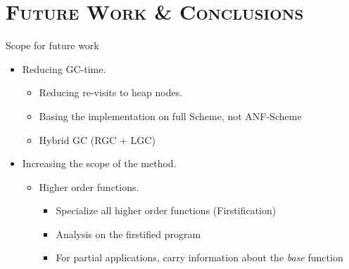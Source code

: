 \documentclass[xcolor=x11names,compress,mathserif]{beamer}
\renewcommand{\(}{\begin{columns}}
\renewcommand{\)}{\end{columns}}
\newcommand{\<}[1]{\begin{column}{#1}}
\renewcommand{\>}{\end{column}}
\begin{document}
\section{\scshape Future Work  \& Conclusions} 
\begin{frame}{Scope for future work}
\normalsize
\begin{itemize}\itemsep2em
\item<1-> Reducing GC-time.
  \begin{itemize}
  \item Reducing re-visits to heap nodes.
  \item Basing the implementation on full Scheme, not ANF-Scheme
  \item Hybrid GC (RGC + LGC)
  \end{itemize}
\item<2-> Increasing the scope of the method.
  \begin{itemize}
   \item Higher order functions.
    \begin{itemize}
    \item Specialize all higher order functions (Firstification)
    \item Analysis on the firstified program 
    \item For partial applications, carry information about the {\em base} function
    \end{itemize}
  \end{itemize}
\end{itemize}
\end{frame}
\end{document}
